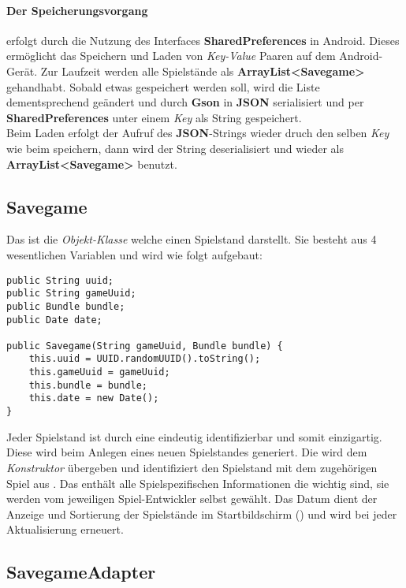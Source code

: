 \paragraph{Der Speicherungsvorgang} erfolgt durch die Nutzung des Interfaces  
\textbf{SharedPreferences} in Android. Dieses ermöglicht das Speichern und Laden von 
\emph{Key-Value} Paaren auf dem Android-Gerät. Zur Laufzeit werden alle Spielstände 
als \textbf{ArrayList\textless Savegame\textgreater} gehandhabt. Sobald etwas 
gespeichert werden soll, wird die Liste dementsprechend geändert und durch 
\textbf{Gson} in \textbf{JSON} serialisiert und per \textbf{SharedPreferences} 
unter einem \emph{Key} als String gespeichert.\\
Beim Laden erfolgt der Aufruf des \textbf{JSON}-Strings wieder druch den selben 
\emph{Key} wie beim speichern, dann wird der String deserialisiert und wieder als 
\textbf{ArrayList\textless Savegame\textgreater} benutzt.

\subsection{Savegame}
Das ist die \emph{Objekt-Klasse} welche einen Spielstand darstellt. Sie besteht 
aus 4 wesentlichen Variablen und wird wie folgt aufgebaut:
\begin{lstlisting}[caption={Savegame Variablen \& Konstruktor},captionpos=b]
public String uuid;
public String gameUuid;
public Bundle bundle;
public Date date;

public Savegame(String gameUuid, Bundle bundle) {
	this.uuid = UUID.randomUUID().toString();
	this.gameUuid = gameUuid;
	this.bundle = bundle;
	this.date = new Date();
}
\end{lstlisting}

Jeder Spielstand ist durch eine  eindeutig identifizierbar und somit 
einzigartig. Diese wird beim Anlegen eines neuen Spielstandes generiert.
Die  wird dem \emph{Konstruktor} übergeben und identifiziert den 
Spielstand mit dem zugehörigen Spiel aus .
Das  enthält alle Spielspezifischen Informationen die wichtig sind, 
sie werden vom jeweiligen Spiel-Entwickler selbst gewählt.
Das Datum dient der Anzeige und Sortierung der Spielstände im Startbildschirm 
() und wird bei jeder Aktualisierung erneuert.

\subsection{SavegameAdapter}


